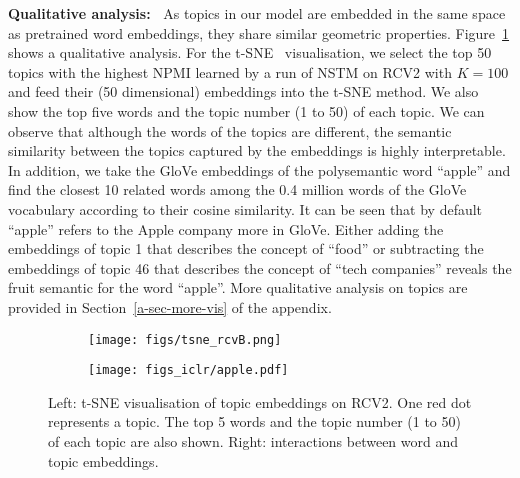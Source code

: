 \documentclass{article}
\begin{document}
\textbf{Qualitative analysis:~}
As topics in our model are embedded in the same space as pretrained word embeddings, they share similar geometric properties.
Figure~\ref{fig-vis} shows a qualitative analysis.
For the t-SNE~\citep{maaten2008visualizing} visualisation, we select the top 50 topics with the highest NPMI learned by a run of NSTM on RCV2 with $K=100$ and feed their (50 dimensional) embeddings into the t-SNE method.
We also show the top five words and the topic number (1 to 50) of each topic. We can observe that although the words of the topics are different, the semantic similarity between the topics captured by the embeddings is highly interpretable.
In addition, we take the GloVe embeddings of the polysemantic word ``apple'' and find the closest 10 related words among the 0.4 million words of the GloVe vocabulary according to their cosine similarity. It can be seen that by default ``apple'' refers to the Apple company more in GloVe. Either adding the embeddings of topic 1 that describes the concept of ``food'' or subtracting the embeddings of topic 46 that describes the concept of ``tech companies'' reveals the fruit semantic for the word ``apple''.
More qualitative analysis on topics are provided in Section~\ref{a-sec-more-vis} of the appendix.





\begin{figure}
\centering
\begin{subfigure}[b]{0.64\linewidth}
                 \centering
                 \texttt{[image: figs/tsne\_rcvB.png]}
         \end{subfigure}\begin{subfigure}[b]{0.36\linewidth}
                 \centering
                 \texttt{[image: figs\_iclr/apple.pdf]}
         \end{subfigure} 
\caption{Left: t-SNE visualisation of topic embeddings on RCV2. One red dot represents a topic. The top 5 words and the topic number (1 to 50) of each topic are also shown. Right: interactions between word and topic embeddings.}
\label{fig-vis}
\end{figure}
\end{document}
